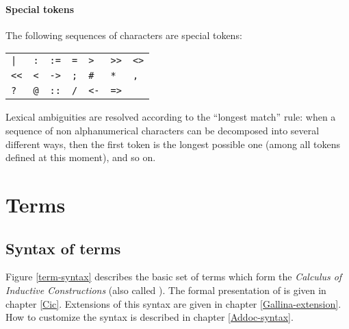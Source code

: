 \paragraph{Special tokens}
The following sequences of characters are special tokens:
\begin{center}
\begin{tabular}{lllllll}
\verb!|!  &
\verb!:!  &
\verb!:=! &
\verb!=!  &
\verb!>!  &
\verb!>>! &
\verb!<>! \\
\verb!<<! &
\verb!<!  &
\verb!->! &
\verb!;!  &
\verb!#!  &
\verb!*!  &
\verb!,!  \\
\verb!?!  &
\verb!@!  &
\verb!::! &
\verb!/!  &
\verb!<-! &
\verb!=>! &
\end{tabular}
\end{center}

Lexical ambiguities are resolved according to the ``longest match''
rule: when a sequence of non alphanumerical characters can be decomposed
into several different ways, then the first token is the longest
possible one (among all tokens defined at this moment), and so on.

\section{Terms}\label{term}
\subsection{Syntax of terms}

Figure \ref{term-syntax} describes the basic set of terms which form
the {\em Calculus
of Inductive Constructions} (also called \CIC). The formal
presentation of {\CIC} is given in chapter \ref{Cic}. Extensions of
this syntax are given in chapter
\ref{Gallina-extension}. How to customize the syntax is described in
chapter \ref{Addoc-syntax}.


